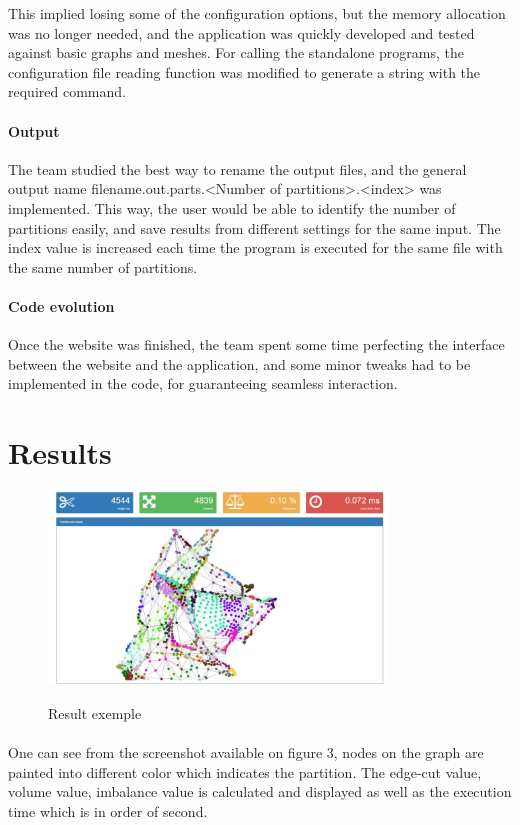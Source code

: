 \documentclass{cranfieldChart}
\begin{document}
This implied losing some of the configuration options, but the memory allocation was no longer needed, and the application was quickly developed and tested against basic graphs and meshes. For calling the standalone programs, the configuration file reading function was modified to generate a string with the required command.

\paragraph{Output}
The team studied the best way to rename the output files, and the general output name filename.out.parts.<Number of partitions>.<index> was implemented. This way, the user would be able to identify the number of partitions easily, and save results from different settings for the same input. The index value is increased each time the program is executed for the same file with the same number of partitions.

\paragraph{Code evolution}
Once the website was finished, the team spent some time perfecting the interface between the website and the application, and some minor tweaks had to be implemented in the code, for guaranteeing seamless interaction.



\section{Results}

\begin{figure}[h!]
\centering
\includegraphics[width=0.8\textwidth]{ressources/graph}
\label{resultexample}
\caption{Result exemple}
\end{figure}

\paragraph{}
One can see from the screenshot available on figure 3, nodes on the graph are painted into different color which indicates the partition. The edge-cut value, volume value, imbalance value is calculated and displayed as well as the execution time which is in order of second. 
\end{document}

